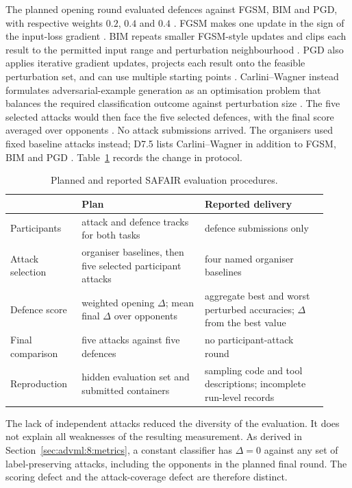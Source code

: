 The planned opening round evaluated defences against FGSM, BIM and PGD, with respective
weights $0.2$, $0.4$ and $0.4$ \cite{sparta2021d73}.
FGSM makes one update in the sign of the input-loss gradient
\cite{goodfellow2015explaining}. BIM repeats smaller
FGSM-style updates and clips each result to the permitted input range and perturbation
neighbourhood \cite{kurakin2017bim}. PGD also applies iterative gradient updates, projects
each result onto the feasible perturbation set, and can use multiple starting points
\cite{madry2018pgd}. Carlini--Wagner instead
formulates adversarial-example generation as an optimisation problem that balances the
required classification outcome against perturbation size \cite{carlini2017robustness}.
The five selected attacks would then face the five selected defences, with the final score
averaged over opponents \cite{sparta2021d73}. No attack submissions arrived. The organisers
used fixed baseline attacks instead; D7.5 lists Carlini--Wagner in addition to FGSM, BIM and PGD
\cite{sparta2021d75}. Table~\ref{tab:advml:designdelivery} records the
change in protocol.

\begin{table}[tbp]
  \caption{Planned and reported SAFAIR evaluation procedures.}
  \label{tab:advml:designdelivery}
  \centering\small
  \begin{tabular}{@{}p{0.20\linewidth}p{0.36\linewidth}p{0.36\linewidth}@{}}
    \toprule
    & \textbf{Plan} \cite{sparta2021d73} & \textbf{Reported delivery} \cite{sparta2021d75,sparta2022d76} \\
    \midrule
    Participants & attack and defence tracks for both tasks & defence submissions only \\
    Attack selection & organiser baselines, then five selected participant attacks & four named organiser baselines \\
    Defence score & weighted opening $\Delta$; mean final $\Delta$ over opponents & aggregate best and worst perturbed accuracies; $\Delta$ from the best value \\
    Final comparison & five attacks against five defences & no participant-attack round \\
    Reproduction & hidden evaluation set and submitted containers & sampling code and tool descriptions; incomplete run-level records \\
    \bottomrule
  \end{tabular}
\end{table}

The lack of independent attacks reduced the diversity of the evaluation. It does not explain
all weaknesses of the resulting measurement. As derived in Section~\ref{sec:advml:8:metrics},
a constant classifier has $\Delta=0$ against any set of label-preserving attacks, including
the opponents in the planned final round. The scoring defect and the attack-coverage defect
are therefore distinct.

